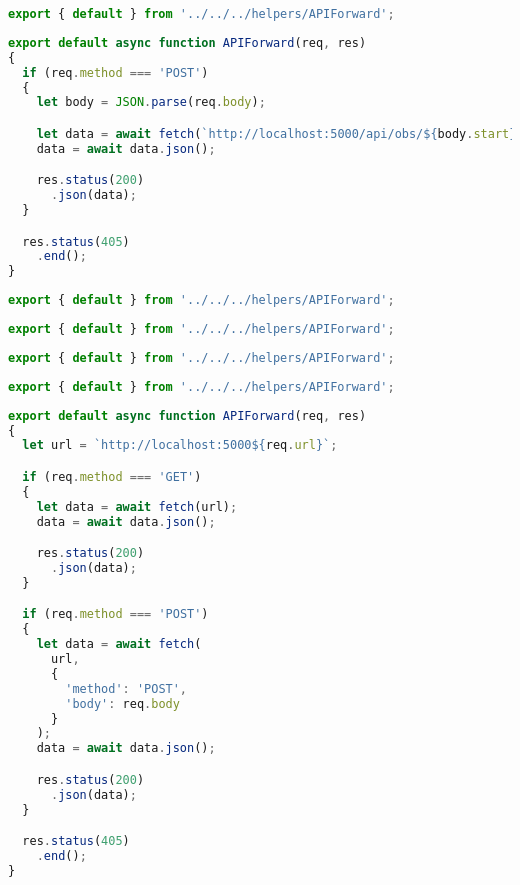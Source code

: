 \documentclass[12pt,a4paper,oneside]{book}
\begin{document}
\begin{lstlisting}[title={raspberrypi/ui/pages/api/light/schedule.js}, language=JavaScript]
export { default } from '../../../helpers/APIForward';
\end{lstlisting}

\bigskip

\begin{lstlisting}[title={/raspberrypi/ui/pages/api/obs/getRange.js}, language=JavaScript]
export default async function APIForward(req, res)
{
  if (req.method === 'POST')
  {
    let body = JSON.parse(req.body);

    let data = await fetch(`http://localhost:5000/api/obs/${body.start}/${body.end}`);
    data = await data.json();

    res.status(200)
      .json(data);
  }

  res.status(405)
    .end();
}
\end{lstlisting}

\bigskip

\begin{lstlisting}[title={/raspberrypi/ui/pages/api/obs/lastDay.js}, language=JavaScript]
export { default } from '../../../helpers/APIForward';
\end{lstlisting}

\bigskip

\begin{lstlisting}[title={/raspberrypi/ui/pages/api/obs/newest.js}, language=JavaScript]
export { default } from '../../../helpers/APIForward';
\end{lstlisting}

\bigskip

\begin{lstlisting}[title={raspberrypi/ui/pages/api/pump/interval.js}, language=JavaScript]
export { default } from '../../../helpers/APIForward';
\end{lstlisting}

\bigskip

\begin{lstlisting}[title={raspberrypi/ui/pages/api/pump/schedule.js}, language=JavaScript]
export { default } from '../../../helpers/APIForward';
\end{lstlisting}

\bigskip

\begin{lstlisting}[title={raspberrypi/ui/helpers/APIForward.js}, language=JavaScript]
export default async function APIForward(req, res)
{
  let url = `http://localhost:5000${req.url}`;

  if (req.method === 'GET')
  {
    let data = await fetch(url);
    data = await data.json();

    res.status(200)
      .json(data);
  }

  if (req.method === 'POST')
  {
    let data = await fetch(
      url,
      {
        'method': 'POST',
        'body': req.body
      }
    );
    data = await data.json();

    res.status(200)
      .json(data);
  }

  res.status(405)
    .end();
}
\end{lstlisting}
\end{document}
